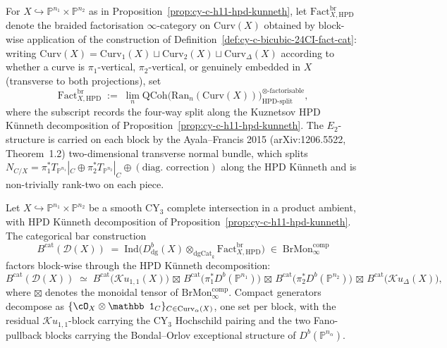 \begin{definition}
\label{def:cy-c-h11-hpd-fact-cat}
For $X \hookrightarrow \mathbb P^{n_1} \times \mathbb P^{n_2}$ as in
Proposition~\ref{prop:cy-c-h11-hpd-kunneth}, let
$\mathrm{Fact}^{\mathrm{br}}_{X, \mathrm{HPD}}$ denote the braided
factorisation $\infty$-category on $\mathrm{Curv}(X)$ obtained by
block-wise application of the construction of
Definition~\ref{def:cy-c-bicubic-24CI-fact-cat}: writing
$\mathrm{Curv}(X) = \mathrm{Curv}_1(X) \sqcup \mathrm{Curv}_2(X)
\sqcup \mathrm{Curv}_\Delta(X)$ according to whether a curve is
$\pi_1$-vertical, $\pi_2$-vertical, or genuinely embedded in $X$
(transverse to both projections), set
\[
 \mathrm{Fact}^{\mathrm{br}}_{X, \mathrm{HPD}}
 \;:=\;
 \lim_n \mathrm{QCoh}\bigl(\mathrm{Ran}_n(\mathrm{Curv}(X))\bigr)^{\otimes\text{-factorisable}}_{\mathrm{HPD}\text{-split}},
\]
where the subscript records the four-way split along the Kuznetsov
HPD Künneth decomposition of
Proposition~\ref{prop:cy-c-h11-hpd-kunneth}. The $E_2$-structure is
carried on each block by the Ayala--Francis 2015
(arXiv:1206.5522, Theorem~1.2) two-dimensional transverse normal
bundle, which splits
$N_{C/X} = \pi_1^* T_{\mathbb P^{n_1}}|_C \oplus
\pi_2^* T_{\mathbb P^{n_2}}|_C \oplus (\text{diag.\ correction})$
along the HPD Künneth and is non-trivially rank-two on each piece.
\end{definition}

\begin{theorem}
\label{thm:cy-c-h11-bcat-hpd-split}
Let $X \hookrightarrow \mathbb P^{n_1} \times \mathbb P^{n_2}$ be a
smooth CY$_3$ complete intersection in a product ambient, with HPD
Künneth decomposition of Proposition~\ref{prop:cy-c-h11-hpd-kunneth}.
The categorical bar construction
\[
 B^{\mathrm{cat}}(\mathcal D(X))
 \;=\;
 \mathrm{Ind}\!\bigl(
 D^b_{\mathrm{dg}}(X) \otimes_{\mathrm{dgCat}_k}
 \mathrm{Fact}^{\mathrm{br}}_{X, \mathrm{HPD}}
 \bigr)
 \;\in\; \mathrm{BrMon}^{\mathrm{comp}}_\infty
\]
factors block-wise through the HPD Künneth decomposition:
\[
 B^{\mathrm{cat}}(\mathcal D(X))
 \;\simeq\;
 B^{\mathrm{cat}}\bigl(\mathcal{K}u_{1,1}(X)\bigr) \,\boxtimes\,
 B^{\mathrm{cat}}\bigl(\pi_1^* D^b(\mathbb P^{n_1})\bigr) \,\boxtimes\,
 B^{\mathrm{cat}}\bigl(\pi_2^* D^b(\mathbb P^{n_2})\bigr) \,\boxtimes\,
 B^{\mathrm{cat}}\bigl(\mathcal{K}u_\Delta(X)\bigr),
\]
where $\boxtimes$ denotes the monoidal tensor of
$\mathrm{BrMon}^{\mathrm{comp}}_\infty$. Compact generators decompose
as $\{\cO_X \otimes \mathbb 1_C\}_{C \in \mathrm{Curv}_\alpha(X)}$,
one set per block, with the residual $\mathcal{K}u_{1,1}$-block
carrying the CY$_3$ Hochschild pairing and the two Fano-pullback
blocks carrying the Bondal--Orlov exceptional structure of
$D^b(\mathbb P^{n_\alpha})$.
\end{theorem}

